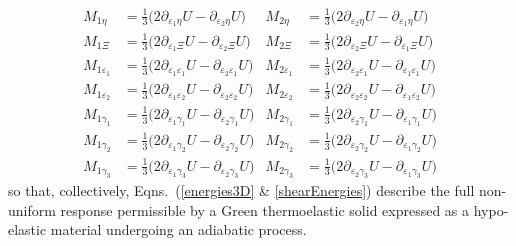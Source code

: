 \begin{subequations}  
    \label{shearEnergies}
    \begin{align}
    M_{1\eta} & = \tfrac{1}{3} \bigl( 2 \partial_{\varepsilon_1 \eta} U -
        \partial_{\varepsilon_2 \eta} U \bigr) &
    M_{2\eta} & = \tfrac{1}{3} \bigl( 2 \partial_{\varepsilon_2 \eta} U -
    \partial_{\varepsilon_1 \eta} U \bigr) \\
    M_{1\Xi} & = \tfrac{1}{3} \bigl( 2 \partial_{\varepsilon_1 \Xi} U -
    \partial_{\varepsilon_2 \Xi} U \bigr) &
    M_{2\Xi} & = \tfrac{1}{3} \bigl( 2 \partial_{\varepsilon_2 \Xi} U -
    \partial_{\varepsilon_1 \Xi} U \bigr) \\
    M_{1\varepsilon_1} & = \tfrac{1}{3} \bigl( 2 \partial_{\varepsilon_1 \varepsilon_1} U -
    \partial_{\varepsilon_2 \varepsilon_1} U \bigr) & 
    M_{2\varepsilon_1} & = \tfrac{1}{3} \bigl( 2 \partial_{\varepsilon_2 \varepsilon_1} U -
    \partial_{\varepsilon_1 \varepsilon_1} U \bigr) \\
    M_{1\varepsilon_2} & = \tfrac{1}{3} \bigl( 2 \partial_{\varepsilon_1 \varepsilon_2} U -
    \partial_{\varepsilon_2 \varepsilon_2} U \bigr) & 
    M_{2\varepsilon_2} & = \tfrac{1}{3} \bigl( 2 \partial_{\varepsilon_2 \varepsilon_2} U -
    \partial_{\varepsilon_1 \varepsilon_2} U \bigr) \\
    M_{1\gamma_1} & = \tfrac{1}{3} \bigl( 2 \partial_{\varepsilon_1 \gamma_1} U -
    \partial_{\varepsilon_2 \gamma_1} U \bigr) &
    M_{2\gamma_1} & = \tfrac{1}{3} \bigl( 2 \partial_{\varepsilon_2 \gamma_1} U -
    \partial_{\varepsilon_1 \gamma_1} U \bigr) \\
    M_{1\gamma_2} & = \tfrac{1}{3} \bigl( 2 \partial_{\varepsilon_1 \gamma_2} U -
    \partial_{\varepsilon_2 \gamma_2} U \bigr) &
    M_{2\gamma_2} & = \tfrac{1}{3} \bigl( 2 \partial_{\varepsilon_2 \gamma_2} U -
    \partial_{\varepsilon_1 \gamma_2} U \bigr) \\
    M_{1\gamma_3} & = \tfrac{1}{3} \bigl( 2 \partial_{\varepsilon_1 \gamma_3} U -
    \partial_{\varepsilon_2 \gamma_3} U \bigr) &
    M_{2\gamma_3} & = \tfrac{1}{3} \bigl( 2 \partial_{\varepsilon_2 \gamma_3} U -
    \partial_{\varepsilon_1 \gamma_3} U \bigr)
    \end{align}
\end{subequations}
so that, collectively, Eqns.~(\ref{energies3D} \& \ref{shearEnergies}) describe the full non-uniform response permissible by a Green thermo\-elastic solid expressed as a hypo-elastic material undergoing an adiabatic process.


